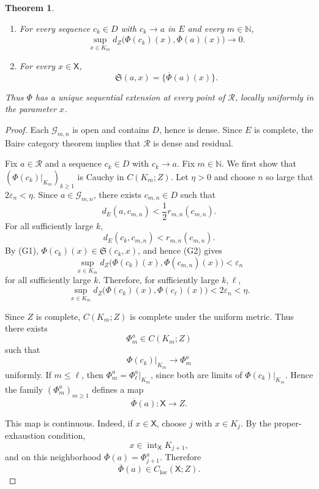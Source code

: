 \documentclass[12pt,oneside, reqno]{amsart}
\newtheorem{theorem}{Theorem}[section]
\numberwithin{equation}{section}
\begin{document}
\begin{theorem}
		\begin{enumerate}
			\item[\textnormal{(i)}]
			For every sequence $c_k\in D$ with $c_k\to a$ in $E$ and every
			$m\in\mathbb N$,
			\[
			\sup_{x\in K_m}
			d_Z\bigl(\Phi(c_k)(x),\overline\Phi(a)(x)\bigr)
			\longrightarrow0.
			\]
			
			\item[\textnormal{(ii)}]
			For every $x\in\mathsf X$,
			\[
			\mathfrak S(a,x)=\big\{\overline\Phi(a)(x)\big\}.
			\]
		\end{enumerate}
		Thus $\Phi$ has a unique sequential extension at every point of
		$\mathcal R$, locally uniformly in the parameter $x$.
	\end{theorem}
	
\begin{proof}
	Each \(\mathcal G_{m,n}\) is open and contains \(D\), hence is dense.
	Since \(E\) is complete, the Baire category theorem implies that
	\(\mathcal R\) is dense and residual.
	
	Fix \(a\in\mathcal R\) and a sequence \(c_k\in D\) with
	\(c_k\to a\). Fix \(m\in\mathbb N\). We first show that
	\((\Phi(c_k)|_{K_m})_{k\geq1}\) is Cauchy in \(C(K_m;Z)\).
	Let \(\eta>0\) and choose \(n\) so large that
	\(2\varepsilon_n<\eta\). Since \(a\in\mathcal G_{m,n}\), there exists
	\(c_{m,n}\in D\) such that
	\[
	d_E(a,c_{m,n})
	<
	\frac12 r_{m,n}(c_{m,n}).
	\]
	For all sufficiently large \(k\),
	\[
	d_E(c_k,c_{m,n})
	<
	r_{m,n}(c_{m,n}).
	\]
	By \textnormal{(G1)},
	\(\Phi(c_k)(x)\in\mathfrak S(c_k,x)\), and hence
	\textnormal{(G2)} gives
	\[
	\sup_{x\in K_m}
	d_Z\bigl(\Phi(c_k)(x),\Phi(c_{m,n})(x)\bigr)
	<
	\varepsilon_n
	\]
	for all sufficiently large \(k\). Therefore, for sufficiently large
	\(k,\ell\),
	\[
	\sup_{x\in K_m}
	d_Z\bigl(\Phi(c_k)(x),\Phi(c_\ell)(x)\bigr)
	<
	2\varepsilon_n
	<
	\eta.
	\]
	
	Since \(Z\) is complete, \(C(K_m;Z)\) is complete under the uniform
	metric. Thus there exists
	\[
	\Phi_m^a\in C(K_m;Z)
	\]
	such that
	\[
	\Phi(c_k)|_{K_m}
	\longrightarrow
	\Phi_m^a
	\]
	uniformly. If \(m\leq\ell\), then
	\(\Phi_m^a=\Phi_\ell^a|_{K_m}\), since both are limits of
	\(\Phi(c_k)|_{K_m}\). Hence the family
	\((\Phi_m^a)_{m\geq1}\) defines a map
	\[
	\overline\Phi(a):\mathsf X\longrightarrow Z.
	\]
	
	This map is continuous. Indeed, if \(x\in\mathsf X\), choose \(j\)
	with \(x\in K_j\). By the proper-exhaustion condition,
	\[
	x\in\operatorname{int}_{\mathsf X}K_{j+1},
	\]
	and on this neighborhood
	\(\overline\Phi(a)=\Phi_{j+1}^a\). Therefore
	\[
	\overline\Phi(a)\in C_{\mathrm{loc}}(\mathsf X;Z).
	\]
	

\end{proof}
\end{document}

